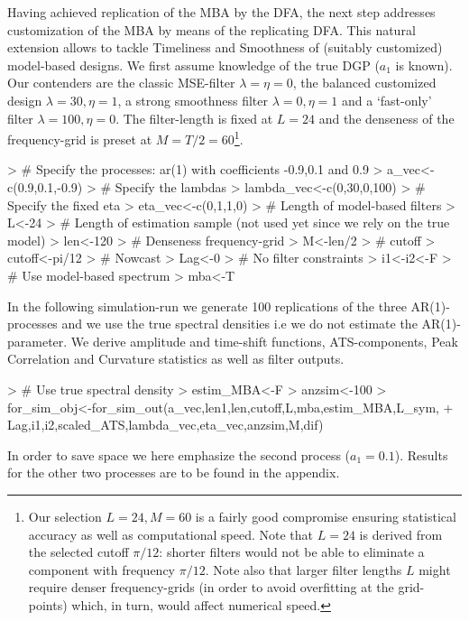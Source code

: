 \documentclass[a4paper]{book}
\begin{document}
Having achieved replication of the MBA by the DFA, the next step addresses customization of the MBA by means of the replicating DFA. This natural extension allows to tackle Timeliness and Smoothness of (suitably customized) model-based designs. We first assume knowledge of the true DGP ($a_1$ is known). Our contenders are the classic MSE-filter $\lambda=\eta=0$, the balanced customized design $\lambda=30,\eta=1$, a strong smoothness filter $\lambda=0,\eta=1$ and a `fast-only' filter $\lambda=100,\eta=0$. The filter-length is fixed at $L=24$ and the denseness of the frequency-grid is preset at $M=T/2=60$\footnote{Our selection $L=24, M=60$ is a fairly good compromise ensuring statistical accuracy as well as computational speed. Note that $L=24$ is derived from the selected cutoff $\pi/12$: shorter filters would not be able to eliminate a component with frequency $\pi/12$. Note also that larger filter lengths $L$ might require denser frequency-grids (in order to avoid overfitting at the grid-points) which, in turn, would affect numerical speed.}.
\begin{Schunk}
\begin{Sinput}
> # Specify the processes: ar(1) with coefficients -0.9,0.1 and 0.9
> a_vec<-c(0.9,0.1,-0.9)
> # Specify the lambdas
> lambda_vec<-c(0,30,0,100)
> # Specify the fixed eta
> eta_vec<-c(0,1,1,0)
> # Length of model-based filters
> L<-24
> # Length of estimation sample (not used yet since we rely on the true model) 
> len<-120
> # Denseness frequency-grid
> M<-len/2
> # cutoff
> cutoff<-pi/12
> # Nowcast
> Lag<-0
> # No filter constraints
> i1<-i2<-F
> # Use model-based spectrum
> mba<-T
\end{Sinput}
\end{Schunk}
In the following simulation-run we generate 100 replications of the three AR(1)-processes and we use the true spectral densities i.e we do not estimate the AR(1)-parameter. We derive amplitude and time-shift functions, ATS-components, Peak Correlation and Curvature statistics as well as filter outputs.
\begin{Schunk}
\begin{Sinput}
> # Use true spectral density
> estim_MBA<-F
> anzsim<-100
> for_sim_obj<-for_sim_out(a_vec,len1,len,cutoff,L,mba,estim_MBA,L_sym,
+                 Lag,i1,i2,scaled_ATS,lambda_vec,eta_vec,anzsim,M,dif)
\end{Sinput}
\end{Schunk}
In order to save space we here emphasize the second process ($a_1=0.1$). Results for the other two processes are to be found in the appendix.
\end{document}
